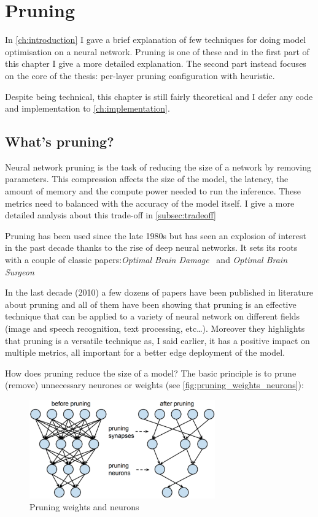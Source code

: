 \chapter{Pruning}\label{ch:pruning}
In \autoref{ch:introduction} I gave a brief explanation of few techniques for
doing model optimisation on a neural network. Pruning is one of these and in
the first part of this chapter I give a more detailed explanation.
The second part instead focuses on the core of the thesis: per-layer pruning
configuration with heuristic.

Despite being technical, this chapter is still fairly theoretical and I defer
any code and implementation to \autoref{ch:implementation}.

\section{What's pruning?}
Neural network pruning is the task of reducing the size of a network by
removing parameters. This compression affects the size of the model, the
latency, the amount of memory and the compute power needed to run the
inference. These metrics need to balanced with the accuracy of the model
itself. I give a more detailed analysis about this trade-off in
\autoref{subsec:tradeoff}

Pruning has been used since the late 1980s but has seen an explosion of
interest in the past decade thanks to the rise of deep neural networks.
It sets its roots with a couple of classic papers:\textit{Optimal Brain
Damage}~\cite{lecun-90b} and \textit{Optimal Brain Surgeon}\cite{hassibi-93}

In the last decade (2010) a few dozens of papers have been published in
literature about pruning and all of them have been showing that pruning is an
effective technique that can be applied to a variety of neural network on
different fields (image and speech recognition, text processing, etc\ldots).
Moreover they highlights that pruning is a versatile technique as, I said
earlier, it has a positive impact on multiple metrics, all important for a
better edge deployment of the model.

How does pruning reduce the size of a model? The basic principle is to prune
(remove) unnecessary neurones or weights (see \autoref{fig:pruning_weights_neurons}):

\begin{figure}[ht]
    \includegraphics[width=8cm]{images/pruning/pruning_weights_neurons.png}
    \centering
    \caption{Pruning weights and neurons}\label{fig:pruning_weights_neurons}
\end{figure}

